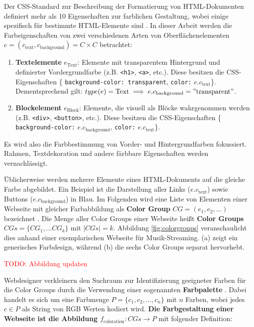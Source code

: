 \documentclass[11pt, bibliography=totoc]{scrartcl}
\begin{document}
Der CSS-Standard zur Beschreibung der Formatierung von HTML-Dokumenten definiert mehr als 10 Eigenschaften zur farblichen Gestaltung, wobei einige spezifisch für bestimmte  HTML-Elemente sind  \citep{css3-color}. In dieser Arbeit werden die Farbeigenschaften von zwei verschiedenen Arten von Oberflächenelementen $e = (c_\text{text}, c_\text{background}) = C \times C$ betrachtet:
\begin{enumerate}
	\item \textbf{Textelemente} $e_\text{Text}$: Elemente mit transparentem Hintergrund und definierter Vordergrundfarbe (z.B. \texttt{<h1>}, \texttt{<a>}, etc.). Diese besitzen die CSS-Eigenschaften \{ \texttt{background-color: transparent}, \texttt{color:} $e.c_\text{text}$\}.\\ Dementsprechend gilt: $type(e) = \text{Text} \implies e.c_\text{background} = "\text{transparent}"$.\\
	\item  \textbf{Blockelement} $e_\text{Block}$: Elemente, die visuell als Blöcke wahrgenommen werden (z.B. \texttt{<div>}, \texttt{<button>}, etc.). Diese besitzen die CSS-Eigenschaften \{ \texttt{background-color:} $e.c_\text{background}$, \texttt{color:} $e.c_\text{text}$\}.
\end{enumerate}
Es wird also die Farbbestimmung von Vorder- und Hintergrundfarben fokussiert. Rahmen, Textdekoration und andere färbbare Eigenschaften werden vernachlässigt.

Üblicherweise werden mehrere Elemente eines HTML-Dokuments auf die gleiche Farbe abgebildet. Ein Beispiel ist die Darstellung aller Links ($e.c_\text{text}$) sowie Buttons ($e.c_\text{background}$) in Blau. Im Folgenden wird eine Liste von Elementen einer Webseite mit gleicher Farbabbildung als \textbf{Color Group} $CG = (e_1, e_2, ...) $ bezeichnet \citep[siehe auch][]{webpage, patterns}. Die Menge aller Color Groups einer Webseite heißt \textbf{Color Groups} $CGs = \{CG_1, ... CG_k\}$ mit $|CGs| = k$. Abbildung \ref{fig:colorgroups} veranschaulicht dies anhand einer exemplarischen Webseite für Musik-Streaming. (a) zeigt ein generisches Farbdesign, während (b) die sechs Color Groups separat hervorhebt.

\textcolor{red}{TODO: Abbildung updaten}

Webdesigner verkleinern den Suchraum zur Identifizierung geeigneter Farben für die Color Groups durch die Verwendung einer sogenannten \textbf{Farbpalette} \citep{webpage, webdesign, webx0}. Dabei handelt es sich um eine Farbmenge $P = \{c_1, c_2, \ldots, c_n\}$ mit $n$ Farben, wobei jedes $c \in P$ als String von RGB Werten kodiert wird. \textbf{Die Farbgestaltung einer Webseite ist die Abbildung $f_\text{coloration}: CGs \to P$} mit folgender Definition:
\end{document}
